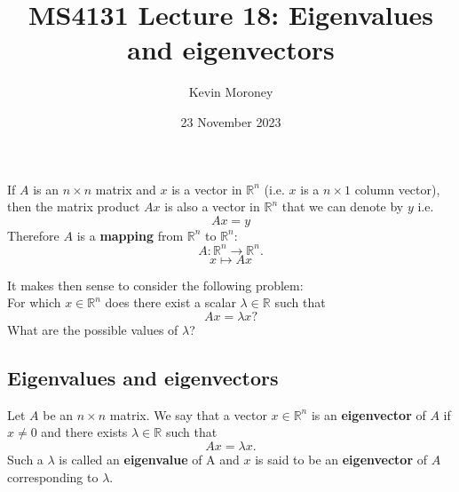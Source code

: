 \documentclass[a4paper, 12pt]{article}
\title{MS4131 Lecture 18: Eigenvalues and eigenvectors}
\author{Kevin Moroney}
\date{23 November 2023}
\newenvironment{definition}[1][Definition]{\begin{trivlist}
\item[\hskip \labelsep {\bfseries #1}]}{\end{trivlist}}
\newenvironment{remark}[1][Remark]{\begin{trivlist}
\item[\hskip \labelsep {\bfseries #1}]}{\end{trivlist}}
\newcommand{\keyword}[1]{\textbf{#1}}
\begin{document}
    \maketitle
    If $A$ is an $n \times n$ matrix and $x$ is a vector in $\mathbb{R}^n$ (i.e. $x$ is a $n \times 1$
    column vector), then the matrix product $Ax$ is also a vector in
    $\mathbb{R}^n$ that we can denote by $y$ i.e.
    \[Ax=y\]
    Therefore $A$ is a \keyword{mapping} from $\mathbb{R}^n$ to $\mathbb{R}^n$:
    \[A: \mathbb{R}^n \rightarrow \mathbb{R}^n.\]
    \[x \mapsto Ax\]
    \begin{remark}
        It makes then sense to consider the following problem:\\
        For which $x \in \mathbb{R}^n$ does there exist a scalar $\lambda \in \mathbb{R}$ such that
        \[Ax = \lambda x?\]
        What are the possible values of $\lambda$?
    \end{remark}
    \subsection*{Eigenvalues and eigenvectors}
    \begin{definition}
        Let $A$ be an $n \times n$ matrix. We say that a vector $x \in \mathbb{R}^n$ is an
        \keyword{eigenvector} of $A$ if $x \neq 0$ and there exists $\lambda \in \mathbb{R}$ such that
        \[Ax = \lambda x.\]
        Such a $\lambda$ is called an \keyword{eigenvalue} of A
        and $x$ is said to be an \keyword{eigenvector} of $A$ corresponding to $\lambda$.
    \end{definition}
\end{document}
